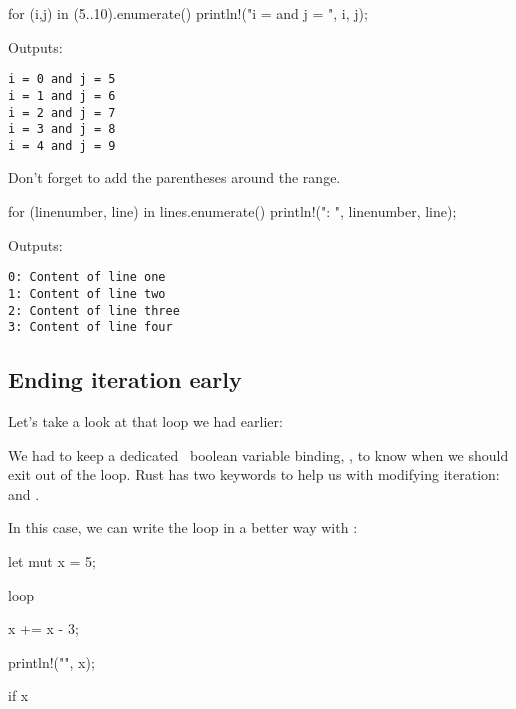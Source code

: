 \begin{rustc}
for (i,j) in (5..10).enumerate() {
    println!("i = {} and j = {}", i, j);
}
\end{rustc}

Outputs:

\begin{verbatim}
i = 0 and j = 5
i = 1 and j = 6
i = 2 and j = 7
i = 3 and j = 8
i = 4 and j = 9
\end{verbatim}

Don't forget to add the parentheses around the range.


\begin{rustc}
for (linenumber, line) in lines.enumerate() {
    println!("{}: {}", linenumber, line);
}
\end{rustc}

Outputs:

\begin{verbatim}
0: Content of line one
1: Content of line two
2: Content of line three
3: Content of line four
\end{verbatim}

\subsection*{Ending iteration early}

Let's take a look at that  loop we had earlier:


We had to keep a dedicated \mut\ boolean variable binding, , to know when we should exit out of the loop. Rust 
has two keywords to help us with modifying iteration:  and .

\blank

In this case, we can write the loop in a better way with :

\begin{rustc}
let mut x = 5;

loop {
    x += x - 3;

    println!("{}", x);

    if x %
}
\end{rustc}

